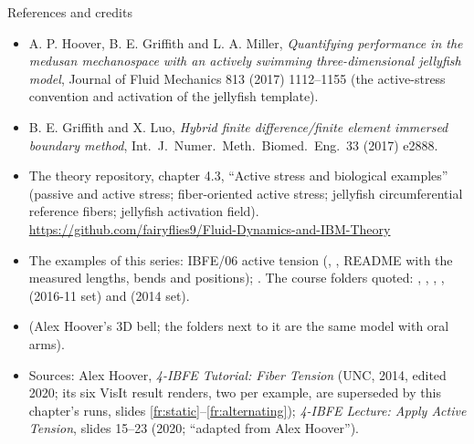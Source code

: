 \documentclass[aspectratio=169,11pt]{beamer}
\begin{document}
\begin{frame}{References and credits}
\label{fr:refs}
\scriptsize
\begin{itemize}
  \item A. P. Hoover, B. E. Griffith and L. A. Miller, \emph{Quantifying performance in the medusan mechanospace with an actively swimming three-dimensional jellyfish model}, Journal of Fluid Mechanics 813 (2017) 1112--1155 (the active-stress convention and activation of the jellyfish template).
  \item B. E. Griffith and X. Luo, \emph{Hybrid finite difference/finite element immersed boundary method}, Int.\ J.\ Numer.\ Meth.\ Biomed.\ Eng.\ 33 (2017) e2888.
  \item The theory repository, chapter 4.3, ``Active stress and biological examples'' (passive and active stress; fiber-oriented active stress; jellyfish circumferential reference fibers; jellyfish activation field). \url{https://github.com/fairyflies9/Fluid-Dynamics-and-IBM-Theory}
  \item The examples of this series: IBFE/06 active tension (, , README with the measured lengths, bends and positions); . The course folders quoted: , , , ,  (2016-11 set) and  (2014 set).
  \item {} (Alex Hoover's 3D bell; the  folders next to it are the same model with oral arms).
  \item Sources: Alex Hoover, \emph{4-IBFE Tutorial: Fiber Tension} (UNC, 2014, edited 2020; its six VisIt result renders, two per example, are superseded by this chapter's runs, slides \ref{fr:static}--\ref{fr:alternating}); \emph{4-IBFE Lecture: Apply Active Tension}, slides 15--23 (2020; ``adapted from Alex Hoover'').
\end{itemize}
\end{frame}
\end{document}
